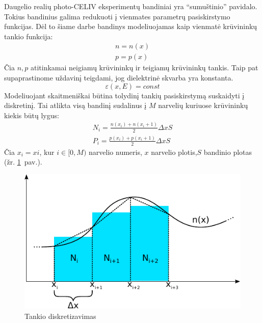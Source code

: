 Daugelio realių photo-CELIV eksperimentų bandiniai yra “sumuštinio” pavidalo. Tokius bandinius galima redukuoti į vienmates parametrų pasiskirstymo funkcijas. Dėl to šiame darbe bandinys modeliuojamas kaip vienmatė krūvininkų tankio funkcija:
\begin{equation}
\begin{array}{c}
n=n(x)\\
p=p(x)
\end{array}
\end{equation}
Čia \(n,p\) atitinkamai neigiamų krūvininkų ir teigiamų krūvininkų tankis. Taip pat supaprastinome uždavinį teigdami, jog dielektrinė skvarba yra konstanta.
\begin{equation}
\varepsilon(x,E)=\textit{const}
\end{equation}
Modeliuojant skaitmeniškai būtina tolydinį tankių pasiskirstymą suskaidyti į diskretinį. Tai atlikta visą bandinį sudalinus į \(M\) narvelių kuriuose krūvininkų kiekis būtų lygus:
\begin{equation}
\begin{array}{c}
N_i = \frac { n(x_i) + n(x_i+1)}{2} \Delta x S\\
P_i = \frac { p(x_i) + p(x_i+1)}{2} \Delta x S
\end{array}
\end{equation}
Čia \(x_i=x i\), kur \(i \in [0,M)\) narvelio numeris, \(x\) narvelio plotis,\(S\) bandinio plotas (žr. \ref{fig:diskretizavimas}~pav.).
\begin{figure}
  \centering
    \includegraphics[scale=0.9]{./media/pdf/il1}
  \caption{Tankio diskretizavimas}
  \label{fig:diskretizavimas}
\end{figure}

